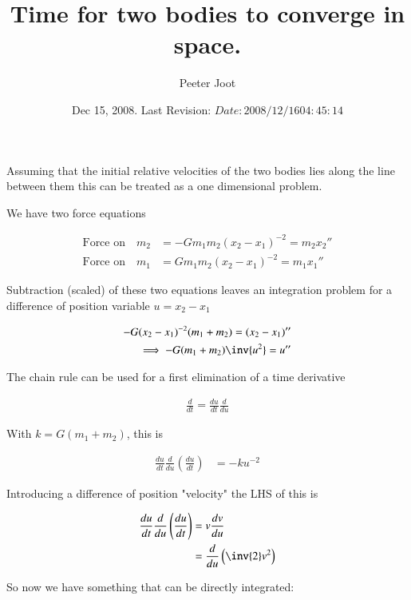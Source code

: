 \documentclass{article}
\title{ Time for two bodies to converge in space. }
\author{Peeter Joot}
\date{ Dec 15, 2008.  Last Revision: $Date: 2008/12/16 04:45:14 $ }
\begin{document}
\maketitle{}

%

Assuming that the initial relative velocities of the two bodies lies along
the line between them this can be treated as a one dimensional problem.

We have two force equations

\begin{align*}
\text{Force on} \quad m_2 &= - G m_1 m_2 (x_2 - x_1)^{-2} = m_2 {x_2}'' \\
\text{Force on} \quad m_1 &=  G m_1 m_2 (x_2 - x_1)^{-2} = m_1 {x_1}''
\end{align*}

Subtraction (scaled) of these two equations leaves an integration problem for a difference of position variable $u = x_2 - x_1$

\begin{align*}
- G (x_2 - x_1)^{-2} (m_1 + m_2)= (x_2 - x_1)'' \\
\implies
- G (m_1 + m_2) \inv{u^2} = u'' \\
\end{align*}

The chain rule can be used for a first elimination of a time derivative

\begin{align*}
\frac{d}{dt} = \frac{du}{dt} \frac{d}{du}
\end{align*}

With $k = G(m_1 + m_2)$, this is

\begin{align*}
\frac{du}{dt} \frac{d}{du} \left(\frac{du}{dt}\right) &= -k u^{-2}
\end{align*}

Introducing a difference of position "velocity" the LHS of this is

\begin{align*}
\frac{du}{dt} \frac{d}{du} \left(\frac{du}{dt}\right)
&= v \frac{dv}{du} \\
&= \frac{d}{du} \left( \inv{2}v^2 \right) \\
\end{align*}

So now we have something that can be directly integrated:
\end{document}
